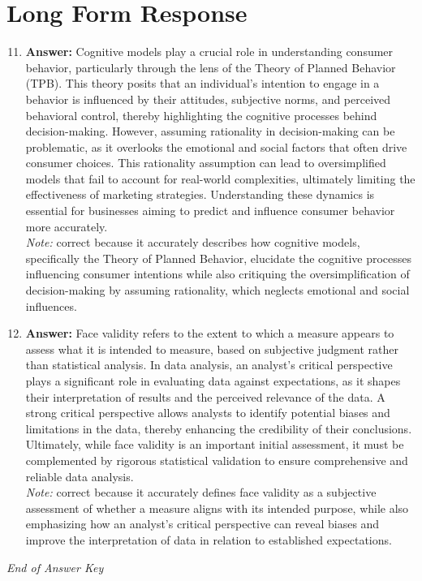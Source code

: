 \documentclass[12pt]{article}
\begin{document}
\section*{Long Form Response}
\begin{enumerate}[label=\arabic*.]
\setcounter{enumi}{10}
\item \textbf{Answer:} Cognitive models play a crucial role in understanding consumer behavior, particularly through the lens of the Theory of Planned Behavior (TPB). This theory posits that an individual's intention to engage in a behavior is influenced by their attitudes, subjective norms, and perceived behavioral control, thereby highlighting the cognitive processes behind decision-making. However, assuming rationality in decision-making can be problematic, as it overlooks the emotional and social factors that often drive consumer choices. This rationality assumption can lead to oversimplified models that fail to account for real-world complexities, ultimately limiting the effectiveness of marketing strategies. Understanding these dynamics is essential for businesses aiming to predict and influence consumer behavior more accurately.
\\ \textit{Note:} correct because it accurately describes how cognitive models, specifically the Theory of Planned Behavior, elucidate the cognitive processes influencing consumer intentions while also critiquing the oversimplification of decision-making by assuming rationality, which neglects emotional and social influences.
\item \textbf{Answer:} Face validity refers to the extent to which a measure appears to assess what it is intended to measure, based on subjective judgment rather than statistical analysis. In data analysis, an analyst's critical perspective plays a significant role in evaluating data against expectations, as it shapes their interpretation of results and the perceived relevance of the data. A strong critical perspective allows analysts to identify potential biases and limitations in the data, thereby enhancing the credibility of their conclusions. Ultimately, while face validity is an important initial assessment, it must be complemented by rigorous statistical validation to ensure comprehensive and reliable data analysis.
\\ \textit{Note:} correct because it accurately defines face validity as a subjective assessment of whether a measure aligns with its intended purpose, while also emphasizing how an analyst's critical perspective can reveal biases and improve the interpretation of data in relation to established expectations.
\end{enumerate}

\vfill
\noindent\textit{End of Answer Key}
\end{document}
